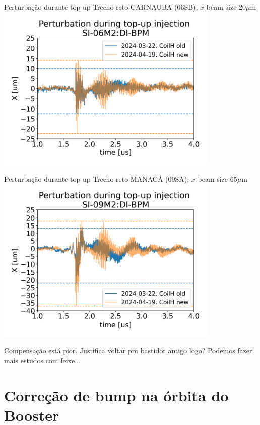 \documentclass[1611]{beamer}					  %
\begin{document}
\begin{frame}{Perturbação durante top-up}
    Trecho reto CARNAUBA (06SB), $x$ beam size 20$\mu$m
    \centering
    \includegraphics[width=0.8\textwidth]{2024-04-19/figures/injection_perturbSI-06M2:DI-BPM.png}
\end{frame}

\begin{frame}{Perturbação durante top-up}
    Trecho reto MANACÁ (09SA), $x$ beam size 65$\mu$m
    \centering
    \includegraphics[width=0.8\textwidth]{2024-04-19/figures/injection_perturbSI-09M2:DI-BPM.png}

    Compensação está pior. Justifica voltar pro bastidor antigo logo? Podemos fazer mais estudos com feixe...
\end{frame}



\section{Correção de bump na órbita do Booster}
\end{document}
